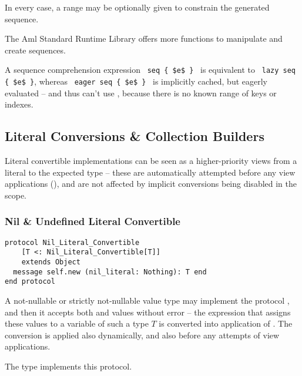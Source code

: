 In every case, a range may be optionally given to constrain the generated sequence. 

The Aml Standard Runtime Library offers more functions to manipulate and create sequences. 

A sequence comprehension expression ~\lstinline!seq { $e$ }!~ is equivalent to ~\lstinline!lazy seq { $e$ }!, whereas ~\lstinline!eager seq { $e$ }!~ is implicitly cached, but eagerly evaluated -- and thus can't use , because there is no known range of keys or indexes.





\subsection{Literal Conversions \& Collection Builders}
\label{sec:literal-conversions}

Literal convertible implementations can be seen as a higher-priority views from a literal to the expected type -- these are automatically attempted before any view applications (), and are not affected by implicit conversions being disabled in the scope.





\subsubsection{Nil \& Undefined Literal Convertible}

\begin{lstlisting}
protocol Nil_Literal_Convertible 
    [T <: Nil_Literal_Convertible[T]] 
    extends Object
  message self.new (nil_literal: Nothing): T end
end protocol
\end{lstlisting}

A not-nullable or strictly not-nullable value type may implement the protocol , and then it accepts both  and  values without error -- the expression that assigns these values to a variable of such a type $T$ is converted into application of . The conversion is applied also dynamically, and also before any attempts of view applications. 

The  type implements this protocol. 


